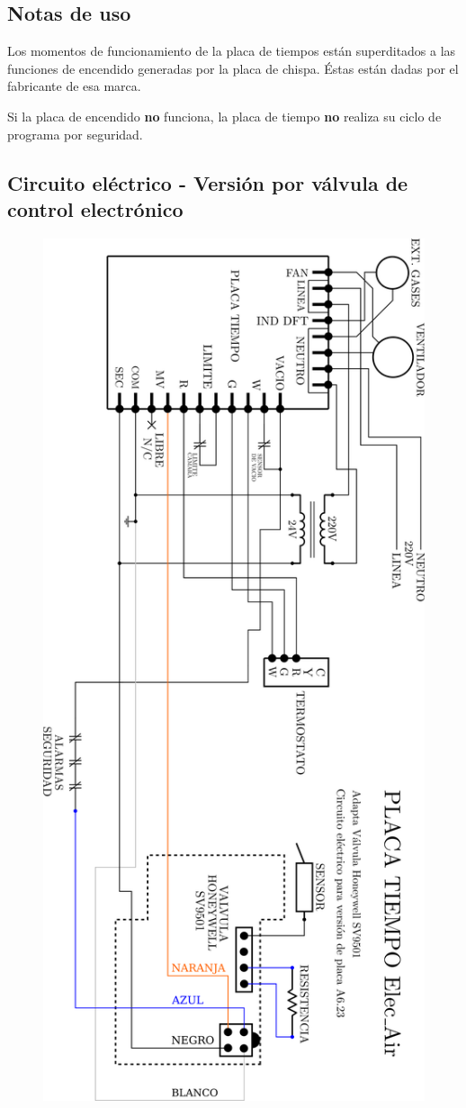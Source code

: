 \documentclass{article}
\begin{document}
\subsection*{Notas de uso}
Los momentos de funcionamiento de la placa de tiempos están superditados a las funciones de encendido generadas por la placa de chispa. Éstas están dadas por el fabricante de esa marca.\par Si la placa de encendido \textbf{no} funciona, la placa de tiempo \textbf{no} realiza su ciclo de programa por seguridad.

\newpage

\subsection*{Circuito eléctrico - Versión por válvula de control electrónico}

\begin{figure}[H]
\centering
\includegraphics[width=0.65\linewidth]{images/PlacaTiempo_PlanoValvulaV623.png}
\end{figure}
\end{document}
